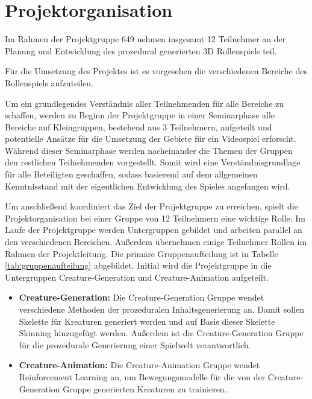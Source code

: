 \section{Projektorganisation}



Im Rahmen der Projektgruppe 649 nehmen insgesamt 12 Teilnehmer an der Planung und Entwicklung des prozedural generierten 3D Rollenspiels teil. 

Für die Umsetzung des Projektes ist es vorgesehen die verschiedenen Bereiche des Rollenspiels aufzuteilen.

Um ein grundlegendes Verständnis aller Teilnehmenden für alle Bereiche zu schaffen, werden zu Beginn der Projektgruppe in einer Seminarphase alle Bereiche auf Kleingruppen, bestehend aus 3 Teilnehmern, aufgeteilt und potentielle Ansätze für die Umsetzung der Gebiete für ein Videospiel erforscht. Während dieser Seminarphase werden nacheinander die Themen der Gruppen den restlichen Teilnehmenden vorgestellt. Somit wird eine Verständnisgrundlage für alle Beteiligten geschaffen, sodass basierend auf dem allgemeinen Kenntnisstand mit der eigentlichen Entwicklung des Spieles angefangen wird. 

Um anschließend koordiniert das Ziel der Projektgruppe zu erreichen, spielt die Projektorganisation bei einer Gruppe von 12 Teilnehmern eine wichtige Rolle. Im Laufe der Projektgruppe werden Untergruppen gebildet und arbeiten parallel an den verschiedenen Bereichen. Außerdem übernehmen einige Teilnehmer Rollen im Rahmen der Projektleitung. Die primäre Gruppenaufteilung ist in Tabelle \ref{tab:gruppenaufteilung} abgebildet. Initial wird die Projektgruppe in die Untergruppen Creature-Generation und Creature-Animation aufgeteilt.

\begin{itemize}
	\item \textbf{Creature-Generation: } Die Creature-Generation Gruppe wendet verschiedene Methoden der prozeduralen Inhaltsgenerierung an. Damit sollen Skelette für Kreaturen generiert werden und auf Basis dieser Skelette Skinning hinzugefügt werden. Außerdem ist die Creature-Generation Gruppe für die prozedurale Generierung einer Spielwelt verantwortlich.
	\item \textbf{Creature-Animation: } Die Creature-Animation Gruppe wendet Reinforcement Learning an, um Bewegungsmodelle für die von der Creature-Generation Gruppe generierten Kreaturen zu trainieren. 
\end{itemize}

